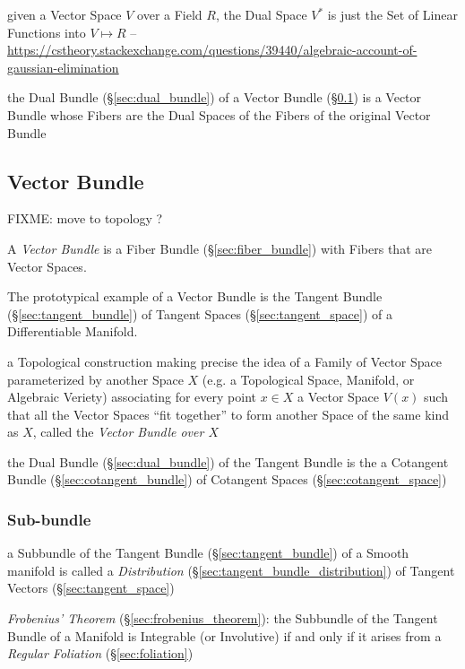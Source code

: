 given a Vector Space $V$ over a Field $R$, the Dual Space $V^*$ is just the Set
of Linear Functions into $V \mapsto R$
--\url{https://cstheory.stackexchange.com/questions/39440/algebraic-account-of-gaussian-elimination}

the Dual Bundle (\S\ref{sec:dual_bundle}) of a Vector Bundle
(\S\ref{sec:vector_bundle}) is a Vector Bundle whose Fibers are the Dual Spaces
of the Fibers of the original Vector Bundle



\subsection{Vector Bundle}\label{sec:vector_bundle}

FIXME: move to topology ?

A \emph{Vector Bundle} is a Fiber Bundle (\S\ref{sec:fiber_bundle}) with Fibers
that are Vector Spaces.

The prototypical example of a Vector Bundle is the Tangent Bundle
(\S\ref{sec:tangent_bundle}) of Tangent Spaces (\S\ref{sec:tangent_space}) of a
Differentiable Manifold.

a Topological construction making precise the idea of a Family of Vector Space
parameterized by another Space $X$ (e.g. a Topological Space, Manifold, or
Algebraic Veriety) associating for every point $x \in X$ a Vector Space $V(x)$
such that all the Vector Spaces ``fit together'' to form another Space of the
same kind as $X$, called the \emph{Vector Bundle over $X$}

the Dual Bundle (\S\ref{sec:dual_bundle}) of the Tangent Bundle is the
a Cotangent Bundle (\S\ref{sec:cotangent_bundle}) of
Cotangent Spaces (\S\ref{sec:cotangent_space})



\subsubsection{Sub-bundle}\label{sec:subbundle}

\fist a Subbundle of the Tangent Bundle (\S\ref{sec:tangent_bundle}) of a
Smooth manifold is called a \emph{Distribution}
(\S\ref{sec:tangent_bundle_distribution}) of Tangent Vectors
(\S\ref{sec:tangent_space})


\emph{Frobenius' Theorem} (\S\ref{sec:frobenius_theorem}): the Subbundle of the
Tangent Bundle of a Manifold is Integrable (or Involutive) if and only if it
arises from a \emph{Regular Foliation} (\S\ref{sec:foliation})



